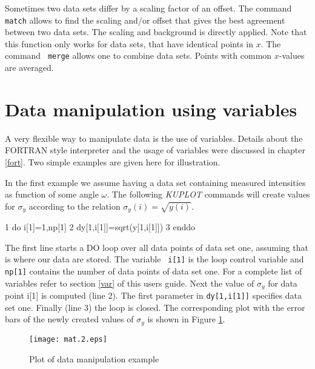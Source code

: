 Sometimes two data sets differ by a scaling factor of an offset. The
command {\tt match} allows to find the scaling and/or offset that
gives the best agreement between two data sets. The scaling and
background is directly applied. Note that this function only works
for data sets, that have identical points in $x$. The command {\tt
merge} allows one to combine data sets. Points with common
$x$-values are averaged.


\section{Data manipulation using variables \label{mat-var}}

A very flexible way to manipulate data is the use of variables.
Details about the FORTRAN style interpreter and the usage of
variables were discussed in chapter \ref{fort}. Two simple examples
are given here for illustration. \par

In the first example we assume having a data set containing measured
intensities as function of some angle $\omega$. The following {\it
KUPLOT} commands will create values for $\sigma_{y}$ according to the
relation $\sigma_{y}(i) = \sqrt{y(i)}$.

\begin{MacVerbatim}
     1  do i[1]=1,np[1]
     2    dy[1,i[1]]=sqrt(y[1,i[1]])
     3  enddo
\end{MacVerbatim}

The first line starts a DO loop over all data points of data set
one, assuming that is where our data are stored. The variable {\tt
i[1]} is the loop control variable and {\tt np[1]} contains the
number of data points of data set one. For a complete list of
variables refer to section \ref{var} of this users guide. Next the
value of $\sigma_{y}$ for data point i[1] is computed (line 2). The
first parameter in {\tt dy[1,i[1]]} specifies data set one. Finally
(line 3) the loop is closed. The corresponding plot with the error
bars of the newly created values of $\sigma_{y}$ is shown in Figure
\ref{mat-fig2}.

\begin{figure}[!t]
   \centering
   \texttt{[image: mat.2.eps]}
   \caption{Plot of data manipulation example}
   \label{mat-fig2}
\end{figure}

